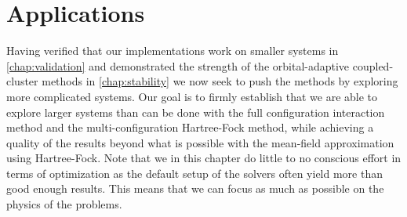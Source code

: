 \chapter{Applications}
    Having verified that our implementations work on smaller systems in
    \autoref{chap:validation} and demonstrated the strength of the
    orbital-adaptive coupled-cluster methods in \autoref{chap:stability} we now
    seek to push the methods by exploring more complicated systems.
    Our goal is to firmly establish that we are able to explore larger systems
    than can be done with the full configuration interaction method and the
    multi-configuration Hartree-Fock method, while achieving a quality of the
    results beyond what is possible with the mean-field approximation using
    Hartree-Fock.
    Note that we in this chapter do little to no conscious effort in terms of
    optimization as the default setup of the solvers often yield more than good
    enough results.
    This means that we can focus as much as possible on the physics of the
    problems.

